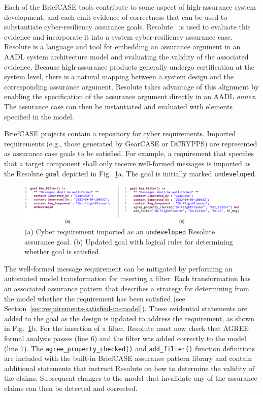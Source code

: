 Each of the BriefCASE tools contribute to some aspect of high-assurance system development, and each emit evidence of correctness that can be used to substantiate cyber-resiliency assurance goals. Resolute~\cite{resolute2014} is used to evaluate this evidence and incorporate it into a system cyber-resiliency assurance case. 
%
Resolute is a language and tool for embedding an assurance argument in an AADL system architecture model and evaluating the validity of the associated evidence. 
Because high-assurance products generally undergo certification at the system level, there is a natural mapping between a system design and the corresponding assurance argument. Resolute takes advantage of this alignment by enabling the specification of the assurance argument directly in an AADL \textit{annex}. The assurance case can then be instantiated and evaluated with elements specified in the model.

BriefCASE projects contain a repository for cyber requirements. Imported requirements (e.g., those generated by GearCASE or DCRYPPS) are represented as assurance case goals to be satisfied. 
For example, a requirement that specifies that a target component shall only receive well-formed messages is imported as the Resolute \texttt{goal} depicted in Fig.~\ref{fig:resolute-requirement}a.  The goal is initially marked \texttt{undeveloped}.

\begin{figure}[h] 
	\centering 
	\includegraphics[width=\textwidth]{figs/resolute-requirement.png}
	\caption{(a) Cyber requirement imported as an \texttt{undeveloped} Resolute assurance goal.  (b) Updated goal with logical rules for determining whether goal is satisfied.}
	\label{fig:resolute-requirement} 
\end{figure}

The well-formed message requirement can be mitigated by performing an automated model transformation for inserting a filter. Each transformation has an associated assurance pattern that describes a strategy for determining from the model whether the requirement has been satisfied (see Section~\ref{sec:requirements-satisfied-in-model}).  
These evidential statements are added to the goal as the design is updated to address the requirement, as shown in Fig.~\ref{fig:resolute-requirement}b.  For the insertion of a filter, Resolute must now check that AGREE formal analysis passes (line 6) and the filter was added correctly to the model (line 7).  The \texttt{agree\_property\_checked()} and \texttt{add\_filter()} function definitions are included with the built-in BriefCASE assurance pattern library and contain additional statements that instruct Resolute on how to determine the validity of the claims. 
Subsequent changes to the model that invalidate any of the assurance claims can then be detected and corrected.  

